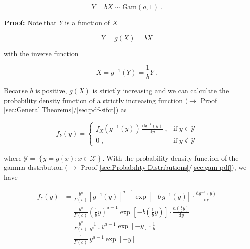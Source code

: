 \documentclass[a4paper,12pt,twoside]{book}
\begin{document}
\begin{equation} \label{eq:gam-sgam2-Y-snorm}
Y = b X \sim \mathrm{Gam}(a,1) \; .
\end{equation}


\vspace{1em}
\textbf{Proof:} Note that $Y$ is a function of $X$

\begin{equation} \label{eq:gam-sgam2-Y-X}
Y = g(X) = b X
\end{equation}

with the inverse function

\begin{equation} \label{eq:gam-sgam2-X-Y}
X = g^{-1}(Y) = \frac{1}{b} Y \; .
\end{equation}

Because $b$ is positive, $g(X)$ is strictly increasing and we can calculate the probability density function of a strictly increasing function ($\rightarrow$ Proof \ref{sec:General Theorems}/\ref{sec:pdf-sifct}) as

\begin{equation} \label{eq:gam-sgam2-pdf-sifct}
f_Y(y) = \left\{
\begin{array}{rl}
f_X(g^{-1}(y)) \, \frac{\mathrm{d}g^{-1}(y)}{\mathrm{d}y} \; , & \text{if} \; y \in \mathcal{Y} \\
0 \; , & \text{if} \; y \notin \mathcal{Y}
\end{array}
\right.
\end{equation}

where $\mathcal{Y} = \left\lbrace y = g(x): x \in \mathcal{X} \right\rbrace$. With the probability density function of the gamma distribution ($\rightarrow$ Proof \ref{sec:Probability Distributions}/\ref{sec:gam-pdf}), we have

\begin{equation} \label{eq:gam-sgam2-pdf-Y}
\begin{split}
f_Y(y) &= \frac{b^a}{\Gamma(a)} [g^{-1}(y)]^{a-1} \exp[-b \, g^{-1}(y)] \cdot \frac{\mathrm{d}g^{-1}(y)}{\mathrm{d}y} \\
&= \frac{b^a}{\Gamma(a)} \left(\frac{1}{b} y\right)^{a-1} \exp\left[-b \left(\frac{1}{b} y\right)\right] \cdot \frac{\mathrm{d}\left(\frac{1}{b} y\right)}{\mathrm{d}y} \\
&= \frac{b^a}{\Gamma(a)} \, \frac{1}{b^{a-1}} \, y^{a-1} \exp[-y] \cdot \frac{1}{b} \\
&= \frac{1}{\Gamma(a)} \, y^{a-1} \exp[-y]
\end{split}
\end{equation}
\end{document}
